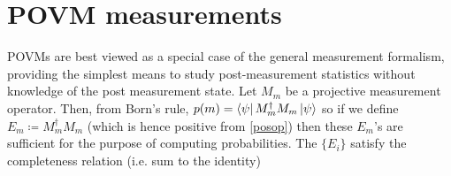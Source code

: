 \documentclass[main.tex]{subfiles}
\begin{document}
%


%




\section{POVM measurements}\label{povm}

POVMs are best viewed as a special case of the general measurement formalism, providing the simplest means to study post-measurement statistics without knowledge of the post measurement state. Let $M_m$ be a projective measurement operator. Then, from Born's rule, $p(m) = \bra{\psi} M_m^\dagger M_m \ket{\psi}$ so if we define $E_m \coloneqq M_m^\dagger M_m$ (which is hence positive from \ref{posop}) then these $E_m$'s are sufficient for the purpose of computing probabilities. The $\{ E_i \}$ satisfy the completeness relation (i.e. sum to the identity)
\end{document}
